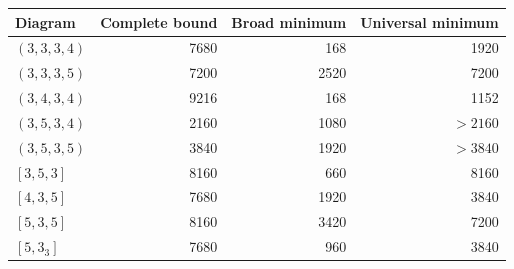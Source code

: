 \begin{center}\small
\begin{tabular}{lrrr}\toprule
Diagram & Complete bound & Broad minimum & Universal minimum\\\midrule
$(3,3,3,4)$ & 7680 & 168 & 1920\\
$(3,3,3,5)$ & 7200 & 2520 & 7200\\
$(3,4,3,4)$ & 9216 & 168 & 1152\\
$(3,5,3,4)$ & 2160 & 1080 & $>2160$\\
$(3,5,3,5)$ & 3840 & 1920 & $>3840$\\
$[3,5,3]$ & 8160 & 660 & 8160\\
$[4,3,5]$ & 7680 & 1920 & 3840\\
$[5,3,5]$ & 8160 & 3420 & 7200\\
$[5,3_3]$ & 7680 & 960 & 3840\\
\bottomrule\end{tabular}\end{center}
